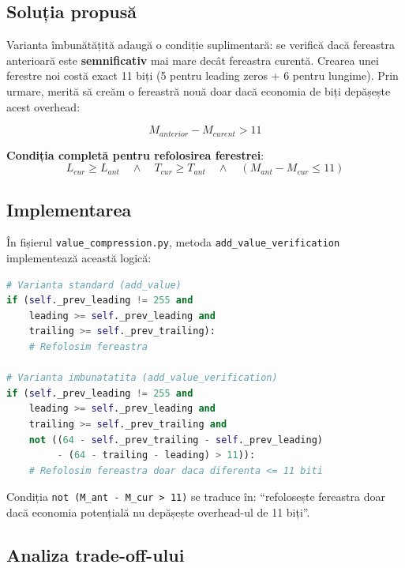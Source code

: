 \subsection{Soluția propusă}

Varianta îmbunătățită adaugă o condiție suplimentară: se verifică dacă fereastra anterioară este \textbf{semnificativ} mai mare decât fereastra curentă. Crearea unei ferestre noi costă exact 11 biți (5 pentru leading zeros + 6 pentru lungime). Prin urmare, merită să creăm o fereastră nouă doar dacă economia de biți depășește acest overhead:

\begin{equation}
    M_{anterior} - M_{curent} > 11
\end{equation}

\textbf{Condiția completă pentru refolosirea ferestrei}:
\begin{equation}
    L_{cur} \geq L_{ant} \quad \land \quad T_{cur} \geq T_{ant} \quad \land \quad (M_{ant} - M_{cur} \leq 11)
\end{equation}

\subsection{Implementarea}

În fișierul \texttt{value\_compression.py}, metoda \texttt{add\_value\_verification} implementează această logică:

\begin{lstlisting}[language=Python, caption={Condiția îmbunătățită pentru refolosirea ferestrei}]
# Varianta standard (add_value)
if (self._prev_leading != 255 and
    leading >= self._prev_leading and
    trailing >= self._prev_trailing):
    # Refolosim fereastra

# Varianta imbunatatita (add_value_verification)
if (self._prev_leading != 255 and
    leading >= self._prev_leading and
    trailing >= self._prev_trailing and
    not ((64 - self._prev_trailing - self._prev_leading)
         - (64 - trailing - leading) > 11)):
    # Refolosim fereastra doar daca diferenta <= 11 biti
\end{lstlisting}

Condiția \texttt{not (M\_ant - M\_cur > 11)} se traduce în: ``refolosește fereastra doar dacă economia potențială nu depășește overhead-ul de 11 biți''.

\subsection{Analiza trade-off-ului}

